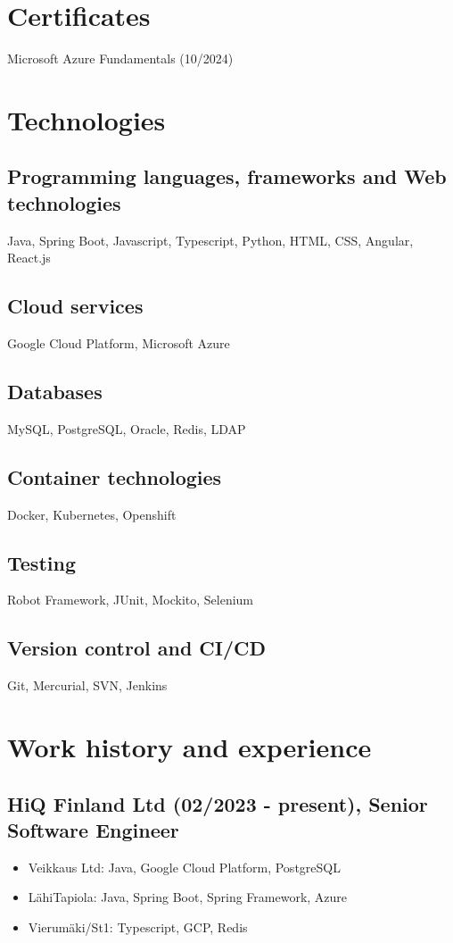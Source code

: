 \documentclass[a4paper,12pt]{article}
\begin{document}
\section*{Certificates}
Microsoft Azure Fundamentals (10/2024)
\section*{Technologies}
\subsection*{Programming languages, frameworks and Web technologies}
Java, Spring Boot, Javascript, Typescript, Python, HTML, CSS, Angular, React.js
\subsection*{Cloud services}
Google Cloud Platform, Microsoft Azure
\subsection*{Databases}
MySQL, PostgreSQL, Oracle, Redis, LDAP
\subsection*{Container technologies}
Docker, Kubernetes, Openshift
\subsection*{Testing}
Robot Framework, JUnit, Mockito, Selenium
\subsection*{Version control and CI/CD}
Git, Mercurial, SVN, Jenkins
\section*{Work history and experience}
\subsection*{HiQ Finland Ltd (02/2023 - present), Senior Software Engineer}
\begin{itemize}
\item{Veikkaus Ltd: Java, Google Cloud Platform, PostgreSQL}
\item{LähiTapiola: Java, Spring Boot, Spring Framework, Azure}
\item{Vierumäki/St1: Typescript, GCP, Redis}
\end{itemize}
\end{document}
